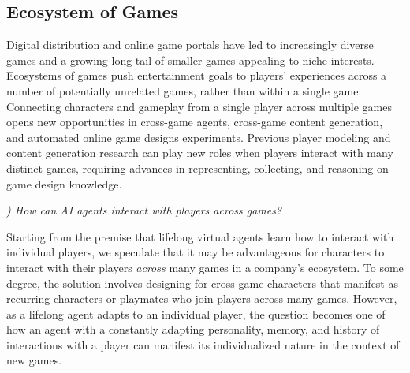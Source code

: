 \documentclass[conference]{IEEEtran}
\newcounter{questionno}
\newcommand{\subsubsectionx}[1]{{\em {\arabic{questionno}) #1}}
	\addtocounter{questionno}{1}
	}
\begin{document}
\subsection{Ecosystem of Games}
Digital distribution and online game portals have led to increasingly diverse games and a growing long-tail of smaller games appealing to niche interests.
Ecosystems of games push entertainment goals to players' experiences across a number of potentially unrelated games, rather than within a single game.
Connecting characters and gameplay from a single player across multiple games opens new opportunities in cross-game agents, cross-game content generation, and automated online game designs experiments. 
Previous player modeling and content generation research can play new roles when players interact with many distinct games, requiring advances in representing, collecting, and reasoning on game design knowledge.

\subsubsectionx{How can AI agents interact with players across games?}
%
Starting from the premise that lifelong virtual agents learn how to interact with individual players, we speculate that it may be advantageous for characters to interact with their players {\em across} many games in a company's ecosystem.
To some degree, the solution involves designing for cross-game characters that manifest as recurring characters or playmates who join players across many games.
However, as a lifelong agent adapts to an individual player, the question becomes one of how an agent with a constantly adapting personality, memory, and history of interactions with a player can manifest its individualized nature in the context of new games.
\end{document}
